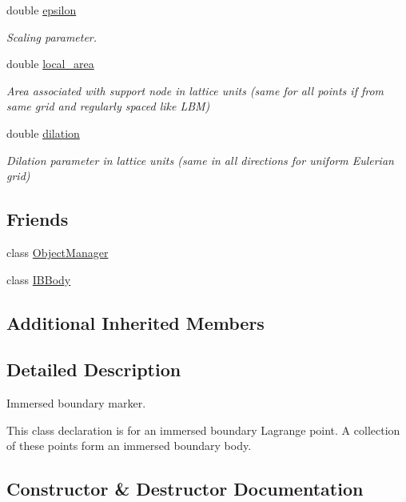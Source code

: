 \begin{DoxyCompactItemize}
double \hyperlink{class_i_b_marker_a8127c61f723299ba0bf04439c1fb1c1e}{epsilon}
\begin{DoxyCompactList}\small\item\em Scaling parameter. \end{DoxyCompactList}\item 
double \hyperlink{class_i_b_marker_aa332dcba1676eae4fbb6d0fa6caca809}{local\+\_\+area}
\begin{DoxyCompactList}\small\item\em Area associated with support node in lattice units (same for all points if from same grid and regularly spaced like L\+BM) \end{DoxyCompactList}\item 
double \hyperlink{class_i_b_marker_a5c908a7e52fc0b2dccbaa277f37b7c22}{dilation}
\begin{DoxyCompactList}\small\item\em Dilation parameter in lattice units (same in all directions for uniform Eulerian grid) \end{DoxyCompactList}\end{DoxyCompactItemize}
\subsection*{Friends}
\begin{DoxyCompactItemize}
\item 
class \hyperlink{class_i_b_marker_a8b86bdcdb7c54a536293d8632363e114}{Object\+Manager}
\item 
class \hyperlink{class_i_b_marker_a5d93aa5aec680a2b395a71266fe4ac92}{I\+B\+Body}
\end{DoxyCompactItemize}
\subsection*{Additional Inherited Members}


\subsection{Detailed Description}
Immersed boundary marker. 

This class declaration is for an immersed boundary Lagrange point. A collection of these points form an immersed boundary body. 

\subsection{Constructor \& Destructor Documentation}
